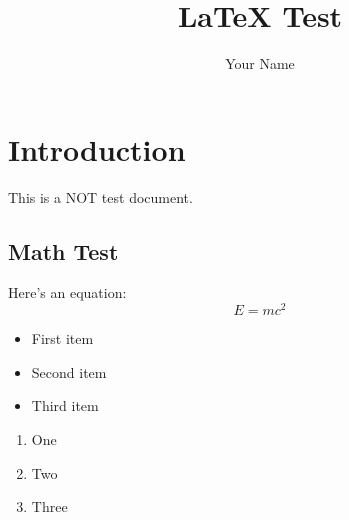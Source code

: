 \documentclass{article}
\begin{document}
\title{LaTeX Test}
\author{Your Name}
\maketitle

\section{Introduction}
This is a NOT test document.

\subsection{Math Test}
Here's an equation:
\begin{equation}
E = mc^2
\end{equation}

    \begin{itemize}
\item First item
        \item Second item
    \item Third item
\end{itemize}

    \begin{enumerate}
  \item One
      \item Two
   \item Three
    \end{enumerate}
\end{document}

